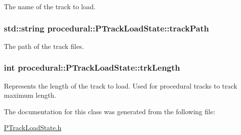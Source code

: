 The name of the track to load. \hypertarget{classprocedural_1_1_p_track_load_state_abacf1626fc5ee56db60f52a336a8c3a0}{
\subsubsection[{track\-Path}]{\setlength{\rightskip}{0pt plus 5cm}std\-::string procedural\-::\-P\-Track\-Load\-State\-::track\-Path\hspace{0.3cm}{\ttfamily [private]}}}\label{classprocedural_1_1_p_track_load_state_abacf1626fc5ee56db60f52a336a8c3a0}
The path of the track files. \hypertarget{classprocedural_1_1_p_track_load_state_a23de09366ebeabe4191c11fb1b0f60a1}{
\subsubsection[{trk\-Length}]{\setlength{\rightskip}{0pt plus 5cm}int procedural\-::\-P\-Track\-Load\-State\-::trk\-Length\hspace{0.3cm}{\ttfamily [private]}}}\label{classprocedural_1_1_p_track_load_state_a23de09366ebeabe4191c11fb1b0f60a1}
Represents the length of the track to load. Used for procedural tracks to track maximum length. 

The documentation for this class was generated from the following file\-:\begin{DoxyCompactItemize}
\item 
\hyperlink{_p_track_load_state_8h}{P\-Track\-Load\-State.\-h}\end{DoxyCompactItemize}
